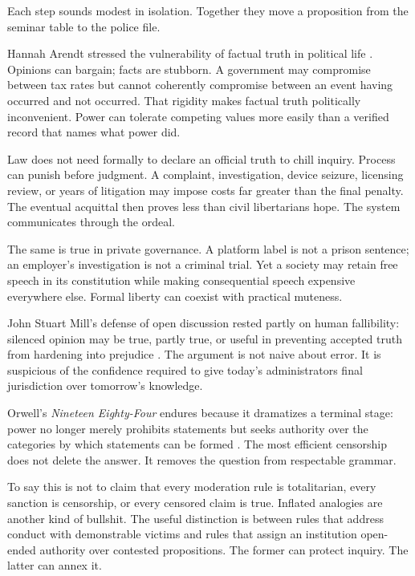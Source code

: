 ﻿\documentclass[12pt,a4paper]{book}
\begin{document}
Each step sounds modest in isolation. Together they move a proposition from the seminar table to the police file.

Hannah Arendt stressed the vulnerability of factual truth in political life \cite{Arendt-1967-truth}. Opinions can bargain; facts are stubborn. A government may compromise between tax rates but cannot coherently compromise between an event having occurred and not occurred. That rigidity makes factual truth politically inconvenient. Power can tolerate competing values more easily than a verified record that names what power did.

Law does not need formally to declare an official truth to chill inquiry. Process can punish before judgment. A complaint, investigation, device seizure, licensing review, or years of litigation may impose costs far greater than the final penalty. The eventual acquittal then proves less than civil libertarians hope. The system communicates through the ordeal.

The same is true in private governance. A platform label is not a prison sentence; an employer's investigation is not a criminal trial. Yet a society may retain free speech in its constitution while making consequential speech expensive everywhere else. Formal liberty can coexist with practical muteness.

John Stuart Mill's defense of open discussion rested partly on human fallibility: silenced opinion may be true, partly true, or useful in preventing accepted truth from hardening into prejudice \cite{Mill1859}. The argument is not naive about error. It is suspicious of the confidence required to give today's administrators final jurisdiction over tomorrow's knowledge.

Orwell's \emph{Nineteen Eighty-Four} endures because it dramatizes a terminal stage: power no longer merely prohibits statements but seeks authority over the categories by which statements can be formed \cite{Orwell-1984}. The most efficient censorship does not delete the answer. It removes the question from respectable grammar.

To say this is not to claim that every moderation rule is totalitarian, every sanction is censorship, or every censored claim is true. Inflated analogies are another kind of bullshit. The useful distinction is between rules that address conduct with demonstrable victims and rules that assign an institution open-ended authority over contested propositions. The former can protect inquiry. The latter can annex it.
\end{document}
